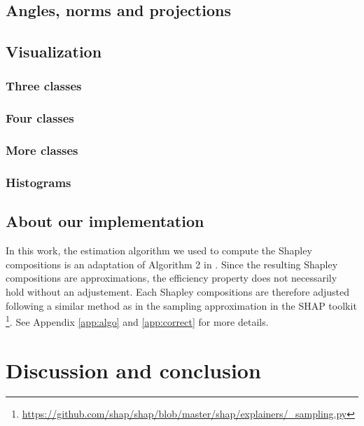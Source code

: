 \documentclass{article}
\theoremstyle{plain}
\theoremstyle{definition}
\theoremstyle{remark}
\begin{document}
\subsection{Angles, norms and projections}

\subsection{Visualization}

\subsubsection{Three classes}

\subsubsection{Four classes}

\subsubsection{More classes}

\subsubsection{Histograms}

\subsection{About our implementation}

In this work, the estimation algorithm we used to compute the Shapley compositions is an adaptation of Algorithm 2 in \cite{vstrumbelj2014explaining}. Since the resulting Shapley compositions are approximations, the efficiency property does not necessarily hold without an adjustement. Each Shapley compositions are therefore adjusted following a similar method as in the sampling approximation in the SHAP toolkit \cite{NIPS2017_7062}\footnote{\url{https://github.com/shap/shap/blob/master/shap/explainers/_sampling.py}}. See Appendix \ref{app:algo} and \ref{app:correct} for more details.

\section{Discussion and conclusion}


\nocite{langley00}
\end{document}
